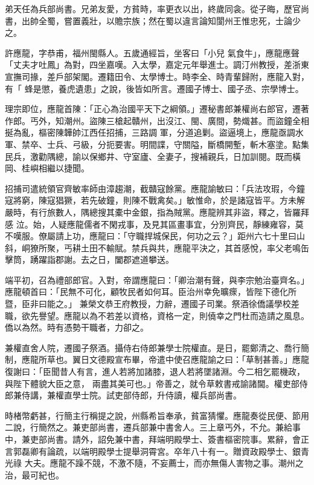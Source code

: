 \begin{pinyinscope}
 弟天任為兵部尚書。兄弟友愛，方貧時，率更衣以出，終歲同衾。從子晦，歷官尚書，出帥全蜀，嘗置義壯，以贍宗族；然在蜀以違言論知閬州王惟忠死，士論少之。


許應龍，字恭甫，福州閩縣人。五歲通經旨，坐客曰「小兒
 氣食牛」，應龍應聲「丈夫才吐鳳」為對，四坐嘉嘆。入太學，嘉定元年舉進士。調汀州教授，差浙東宣撫司掾，差戶部架閣。遷籍田令、太學博士。時李全、時青輩歸附，應龍入對，有「
 蜂是懲，養虎遺患」之說，後皆如所言。遷國子博士、國子丞、宗學博士。



 理宗即位，應龍首陳：「正心為治國平天下之綱領。」遷秘書郎兼權尚右郎官，遷著作郎。丐外，知潮州。盜陳三槍起贛州，出沒江、閩、廣間，勢熾甚。而盜鐘全相挻為亂，樞密陳韡帥江西任招捕，三路調
 軍，分道追剿。盜逼境上，應龍亟調水軍、禁卒、士兵、弓級，分扼要害。明間諜，守關隘，斷橋開塹，斬木塞塗。點集民兵，激勸隅總，諭以保鄉井、守室廬、全妻子，搜補親兵，日加訓閱。既而橫岡、桂嶼相繼以捷聞。



 招捕司遣統領官齊敏率師由漳趨潮，截贛寇餘黨。應龍諭敏曰：「兵法攻瑕，今鐘寇將窮，陳寇猖獗，若先破鐘，則陳不戰禽矣。」敏惟命，於是諸寇皆平。方未解嚴時，有行旅數人，隅總搜其橐中金銀，指為賊黨。應龍辨其非盜，釋之，皆羅拜感
 泣。始，人疑應龍儒者不閑戎事，及見其區畫事宜，分別齊民，靜練雍容，莫不嘆服。僚屬請上功，應龍曰：「守職捍城保民，何功之云？」距州六七十里曰山斜，峒獠所聚，丐耕土田不輸賦。禁兵與共，應龍平決之，其首感悅，率父老鳴缶擊筒，踴躍詣郡謝。去之日，闔郡遮道攀送。



 端平初，召為禮部郎官。入對，帝謂應龍曰：「卿治潮有聲，與李宗勉治臺齊名。」應龍頓首曰：「民無不可化，顧牧民者如何耳。臣治州幸免曠瘝，皆陛下德化所暨，臣非曰能之。」
 兼榮文恭王府教授，力辭，遷國子司業。祭酒徐僑議學校差職，欲先譽望。應龍以為不若差以資格，資格一定，則僥幸之門杜而造請之風息。僑以為然。時有憑勢干職者，力卻之。



 兼權直舍人院，遷國子祭酒。攝侍右侍郎兼學士院權直。是日，罷鄭清之、喬行簡制，應龍所草也。翼日文德殿宣布畢，帝遣中使召應龍諭之曰：「草制甚善。」應龍復謝曰：「臣聞昔人有言，進人若將加諸膝，退人若將墜諸淵。今二相乞罷機政，與陛下體貌大臣之意，
 兩盡其美可也。」帝善之，就令草敕書戒諭諸閫。權吏部侍郎兼侍講，兼權直學士院。試吏部侍郎，升侍讀，權兵部尚書。



 時楮幣虧甚，行簡主行稱提之說，州縣希旨奉承，貧富猜懼。應龍奏從民便、節用二說，行簡然之。兼吏部尚書，遷兵部兼中書舍人。三上章丐外，不允。兼給事中，兼吏部尚書。請外，詔免兼中書，拜端明殿學士、簽書樞密院事。累辭，會正言郭磊卿有論疏，以端明殿學士提舉洞霄宮。卒年八十有一。贈資政殿學士、銀青光祿
 大夫。應龍不躁不競，不激不隨，不妄薦士，而亦無傷人害物之事。潮州之治，最可紀也。




\end{pinyinscope}
